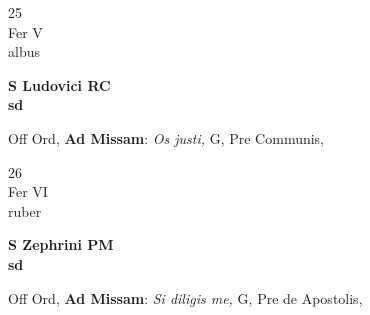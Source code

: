 \documentclass[10pt, openany]{book}
\begin{document}
        \begin{center}
            \begin{minipage}{3.5in}
                \vspace{2em}
                \begin{minipage}{0.5in}
                    {\Huge 25} \\
                    {\normalsize Fer V} \\
                    {\normalsize albus}
                \end{minipage}
                \begin{minipage}{3.0in}
                    \textbf{ \large S Ludovici RC \\
                    \textnormal{\normalsize sd}} \\ 
                \end{minipage}
                \begin{justify}Off Ord, \textbf{Ad Missam}: \textit{Os justi,} G, Pre Communis,  
                \end{justify}
            \end{minipage}
        \end{center}
    
        \begin{center}
            \begin{minipage}{3.5in}
                \vspace{2em}
                \begin{minipage}{0.5in}
                    {\Huge 26} \\
                    {\normalsize Fer VI} \\
                    {\normalsize ruber}
                \end{minipage}
                \begin{minipage}{3.0in}
                    \textbf{ \large S Zephrini PM \\
                    \textnormal{\normalsize sd}} \\ 
                \end{minipage}
                \begin{justify}Off Ord, \textbf{Ad Missam}: \textit{Si diligis me,} G, Pre de Apostolis,  
                \end{justify}
            \end{minipage}
        \end{center}
    
\end{document}
